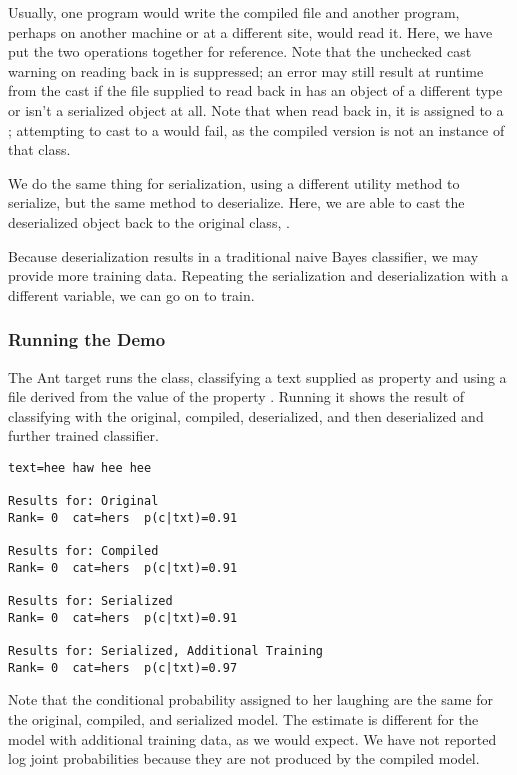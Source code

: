Usually, one program would write the compiled file and another
program, perhaps on another machine or at a different site, would read
it.  Here, we have put the two operations together for reference.
Note that the unchecked cast warning on reading back in is suppressed;
an error may still result at runtime from the cast if the file
supplied to read back in has an object of a different type or isn't a
serialized object at all. Note that when read back in, it is
assigned to a ; attempting to
cast to a  would fail, as the compiled
version is not an instance of that class.

We do the same thing for serialization, using a different utility method
to serialize, but the same  method to deserialize. 
%
%
Here, we are able to cast the deserialized object back to the original
class, .  

Because deserialization results in a traditional naive Bayes
classifier, we may provide more training data.  Repeating the
serialization and deserialization with a different variable,
we can go on to train.
%



\subsubsection{Running the Demo}

The Ant target  runs the class, classifying
a text supplied as property  and using a file derived
from the value of the property .  Running it shows
the result of classifying with the original, compiled, deserialized,
and then deserialized and further trained classifier.

\begin{verbatim}
text=hee haw hee hee

Results for: Original
Rank= 0  cat=hers  p(c|txt)=0.91

Results for: Compiled
Rank= 0  cat=hers  p(c|txt)=0.91

Results for: Serialized
Rank= 0  cat=hers  p(c|txt)=0.91

Results for: Serialized, Additional Training
Rank= 0  cat=hers  p(c|txt)=0.97
\end{verbatim}

Note that the conditional probability assigned to her laughing are the
same for the original, compiled, and serialized model.  The estimate
is different for the model with additional training data, as we
would expect.  We have not reported log joint probabilities because
they are not produced by the compiled model.

